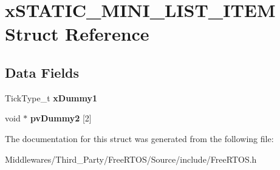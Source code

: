 \hypertarget{structx_s_t_a_t_i_c___m_i_n_i___l_i_s_t___i_t_e_m}{}\section{x\+S\+T\+A\+T\+I\+C\+\_\+\+M\+I\+N\+I\+\_\+\+L\+I\+S\+T\+\_\+\+I\+T\+EM Struct Reference}
\label{structx_s_t_a_t_i_c___m_i_n_i___l_i_s_t___i_t_e_m}
\subsection*{Data Fields}
\begin{DoxyCompactItemize}
\item 
\mbox{\label{structx_s_t_a_t_i_c___m_i_n_i___l_i_s_t___i_t_e_m_a7eacc6e12219b6aee0a8838ae4d5fa67}} 
Tick\+Type\+\_\+t {\bfseries x\+Dummy1}
\item 
\mbox{\label{structx_s_t_a_t_i_c___m_i_n_i___l_i_s_t___i_t_e_m_ad0dea832c70f4f00e7a6b2bfabae5e89}} 
void $\ast$ {\bfseries pv\+Dummy2} \mbox{[}2\mbox{]}
\end{DoxyCompactItemize}


The documentation for this struct was generated from the following file\+:\begin{DoxyCompactItemize}
\item 
Middlewares/\+Third\+\_\+\+Party/\+Free\+R\+T\+O\+S/\+Source/include/Free\+R\+T\+O\+S.\+h\end{DoxyCompactItemize}
